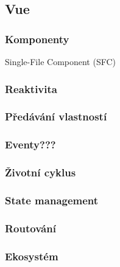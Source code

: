 \subsection{Vue}



\subsubsection{Komponenty}

Single-File Component (SFC)

\subsubsection{Reaktivita}
\subsubsection{Předávání vlastností}
\subsubsection{Eventy???}
\subsubsection{Životní cyklus}
\subsubsection{State management}
\subsubsection{Routování}
\subsubsection{Ekosystém}